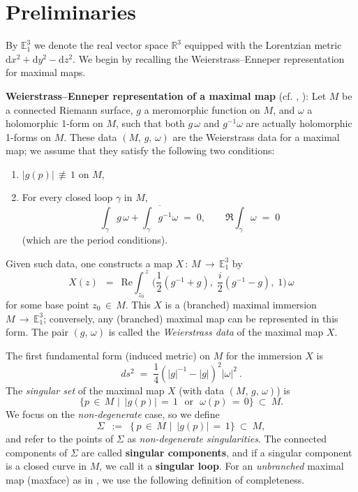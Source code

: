 \documentclass[12pt]{amsart}
\numberwithin{equation}{section}
\begin{document}
\section{Preliminaries}\label{sec:prelim}

By $\mathbb{E}_1^3$ we denote the real vector space $\mathbb{R}^3$ equipped with the Lorentzian metric 
$\mathrm{d}x^2+\mathrm{d}y^2-\mathrm{d}z^2$. We begin by recalling the Weierstrass–Enneper representation for 
maximal maps.

\smallskip 

\noindent \textbf{Weierstrass–Enneper representation of a maximal
map} (cf. \cite{KOBAYASHI1983}, \cite{Estudillo1992}): \; Let $M$ be a connected Riemann surface, $g$ a
meromorphic function on $M$, and $\omega$ a holomorphic 1-form on $M$, such that both $g\,\omega$ and
$g^{-1}\omega$ are actually holomorphic 1-forms on $M$. These data $(M,\,g,\,\omega)$ are the Weierstrass
data for a maximal map; we assume that they satisfy the following two conditions:
\begin{enumerate}
\item $|g(p)|\,\not\equiv\, 1$ on $M$, 
\item For every closed loop $\gamma$ in $M$, 
\begin{equation}\label{period condition}
\int_{\gamma} g\,\omega + \overline{\int_{\gamma} g^{-1}\omega} \;=\; 0, \qquad \Re\! \int_{\gamma} \omega \;=\; 0
\end{equation}
(which are the period conditions).
\end{enumerate} 
Given such data, one constructs a map $X\,:\, M\, \longrightarrow\, \mathbb{E}_1^3$ by 
\begin{equation}\label{maximal_map}
X(z)\ \;=\ \; \mathrm{Re} \int_{z_0}^{\,z} \Big(\frac{1}{2}(g^{-1}+g),\; \frac{i}{2}(g^{-1}-g),\; 1\Big)\,\omega 
\end{equation}
for some base point $z_0\,\in\, M$. This $X$ is a (branched) maximal immersion $M \,\longrightarrow\,
\mathbb{E}_1^3$; conversely, any (branched) maximal map can be represented in this form. The pair
$(g,\,\omega)$ is called the \emph{Weierstrass data} of the maximal map $X$.

The first fundamental form (induced metric) on $M$ for the immersion $X$ is 
\begin{equation}\label{ds}
ds^2 \;=\; \frac{1}{4}\left(|g|^{-1}-|g|\right)^2 |\omega|^2~.
\end{equation}
The \emph{singular set} of the maximal map $X$ (with data $(M,\,g,\,\omega)$) is 
\[
\{p\,\in\, M\,\, \big\vert\,\,\, |g(p)|\,=\,1\,\,  \text{ or }\,\, \omega(p)\,=\,0\}\ \subset\ M.
\] 
We focus on the \emph{non-degenerate} case, so we define 
\begin{equation}\label{eq:singset}
\Sigma\ \;:=\ \; \{\,p\,\in\, M\,\, \big\vert\,\,\, |g(p)|\,=\,1\}\ \subset\ M,
\end{equation}
and refer to the points of $\Sigma$ as \emph{non-degenerate singularities}. The connected components of
$\Sigma$ are called \textbf{singular components}, and if a singular component is a closed curve in $M$, we call it a \textbf{singular loop}.    For an \emph{unbranched} maximal map (maxface) as in \cite{UMEHARA2006}, we use the following definition of completeness.
\end{document}
